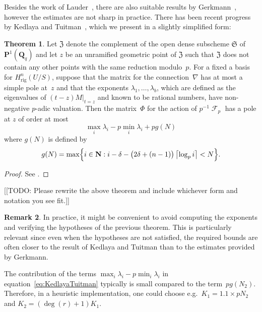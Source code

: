 \documentclass[a4paper,11pt]{article}
\numberwithin{equation}{section}
\providecommand{\ceil}[1]{\left\lceil#1\right\rceil}   %
\DeclareMathOperator{\Frob}{\mathcal{F}} %
\providecommand{\Hrig}{H_{\text{rig}}}  %
\theoremstyle{definition}
\newtheorem{thm}{Theorem}[section]
\newtheorem{rem}[thm]{Remark}
\begin{document}
Besides the work of Lauder~\citep[\S 8.1]{Lauder2004a}, there are also 
suitable results by Gerkmann~\citep[\S 6]{Gerkmann2007}, however the 
estimates are not sharp in practice.  There has been recent progress by 
Kedlaya and Tuitman~\citep[Theorem~2.1]{KedlayaTuitman2012}, which we 
present in a slightly simplified form:

\begin{thm} \label{thm:KedlayaTuitman}
Let $\mathfrak{Z}$ denote the complement of the open dense 
subscheme $\mathfrak{S}$ of $\mathbf{P}^{1}(\mathbf{Q}_q)$ 
and let $z$ be an unramified geometric point of $\mathfrak{Z}$ 
such that $\mathfrak{Z}$ does not contain any other points 
with the same reduction modulo~$p$.  For a fixed a basis for 
$\Hrig^n(U/S)$, suppose that the matrix 
for the connection~$\nabla$ has at most a simple pole at~$z$ 
and that the exponents $\lambda_1, \dotsc, \lambda_{b}$, 
which are defined as the eigenvalues of $(t - z) M \vert_{t=z}$ 
and known to be rational numbers, have non-negative $p$-adic 
valuation.  Then the matrix~$\Phi$ for the action of $p^{-1} \Frob_p$ 
has a pole at $z$ of order at most 
\begin{equation} \label{eq:KedlayaTuitman}
\max_{i} \lambda_i - p \min_{i} \lambda_i + p g(N)
\end{equation}
where $g(N)$ is defined by 
\begin{equation}
g(N) = \max\Bigl\{ i \in \mathbf{N} : i - \delta - \bigl(2\delta + (n-1)\bigr) \ceil{\log_p i} < N \Bigr\}.
\end{equation}
\end{thm}

\begin{proof}
See \citep[Theorem~2.1]{KedlayaTuitman2012}.
\end{proof}

[[TODO:  Please rewrite the above theorem and include whichever 
form and notation you see fit.]]

\begin{rem} \label{rem:KedlayaTuitman}
In practice, it might be convenient to avoid computing the exponents and 
verifying the hypotheses of the previous theorem.  This is particularly 
relevant since even when the hypotheses are not satisfied, the required 
bounds are often closer to the result of Kedlaya and Tuitman than to the 
estimates provided by Gerkmann.

The contribution of the terms $\max_i \lambda_i - p \min_i \lambda_i$ 
in equation~\eqref{eq:KedlayaTuitman} typically is small compared to the 
term~$p g(N_2)$. Therefore, in a heuristic implementation, one 
could choose e.g.\ $K_1 = 1.1 \times p N_2$ and $K_2 = (\deg(r) + 1) K_1$.
\end{rem}
\end{document}
